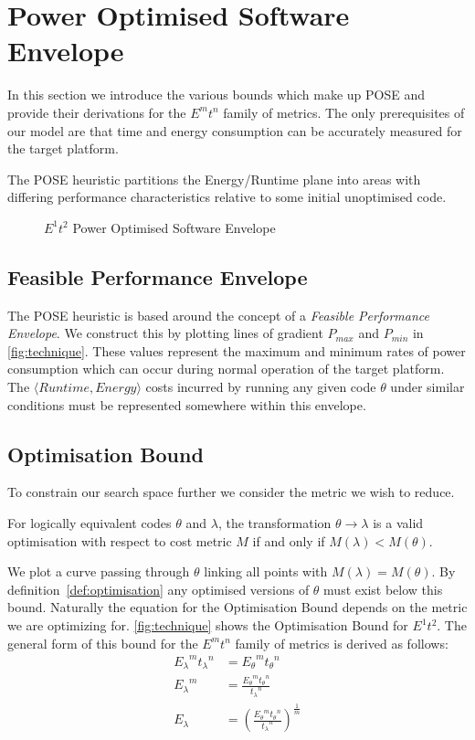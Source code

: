 \section{Power Optimised Software Envelope}
\label{sec:pose}
In this section we introduce the various bounds which make up POSE and provide their derivations for the $E^mt^n$ family of metrics.
The only prerequisites of our model are that time and energy consumption can be accurately measured for the target platform.

The POSE heuristic partitions the Energy/Runtime plane into areas with differing performance characteristics relative to some initial unoptimised code.

\begin{figure}
\centering

\caption{$E^1t^2$ Power Optimised Software Envelope}
\label{fig:technique}
\end{figure}

\subsection{Feasible Performance Envelope}
The POSE heuristic is based around the concept of a \emph{Feasible Performance Envelope}.
We construct this by plotting lines of gradient $P_{max}$ and $P_{min}$ in \autoref{fig:technique}.
These values represent the maximum and minimum rates of power consumption which can occur during normal operation of the target platform.
The $\langle Runtime, Energy\rangle$ costs incurred by running any given code $\theta$ under similar conditions must be represented somewhere within this envelope.

\subsection{Optimisation Bound}
To constrain our search space further we consider the metric we wish to reduce.

\begin{definition}
For logically equivalent codes $\theta$ and $\lambda$, the transformation ${\theta \to \lambda}$ is a valid optimisation with respect to cost metric $M$ if and only if ${M(\lambda) < M(\theta)}$.
\label{def:optimisation}
\end{definition}

We plot a curve passing through $\theta$ linking all points with ${M(\lambda) = M(\theta)}$. By definition~\ref{def:optimisation} any optimised versions of $\theta$ must exist below this bound.
Naturally the equation for the Optimisation Bound depends on the metric we are optimizing for.
\autoref{fig:technique} shows the Optimisation Bound for $E^1t^2$.
The general form of this bound for the $E^mt^n$ family of metrics is derived as follows:
\begin{align}
 {E_\lambda}^m{t_\lambda}^n &= {E_\theta}^m{t_\theta}^n \nonumber \\
 {E_\lambda}^m &= \frac{{E_\theta}^m{t_\theta}^n}{{t_\lambda}^n} \nonumber \\
  E_\lambda &= (\frac{{E_\theta}^m{t_\theta}^n}{{t_\lambda}^n})^\frac{1}{m}
\label{eq:optimisation}
\end{align}

